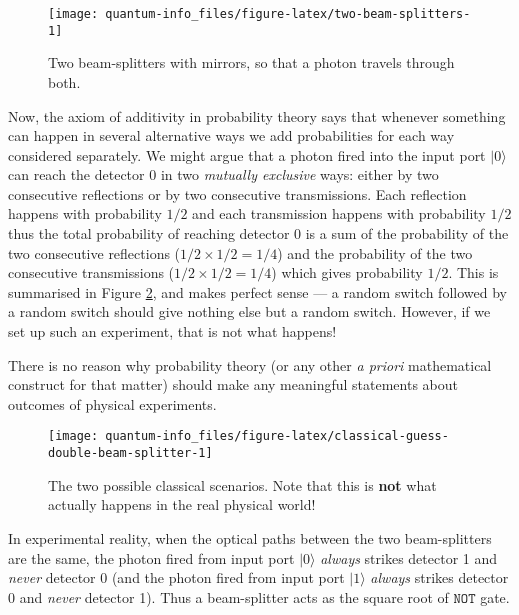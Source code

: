 \documentclass[fleqn]{article}
\newenvironment{idea}{\noindent}{\medskip}
\begin{document}
\begin{figure}[H]

{\centering \texttt{[image: quantum-info\_files/figure-latex/two-beam-splitters-1]} 

}

\caption{Two beam-splitters with mirrors, so that a photon travels through both.}\label{fig:two-beam-splitters}
\end{figure}

Now, the axiom of additivity in probability theory says that whenever something can happen in several alternative ways we add probabilities for each way considered separately.
We might argue that a photon fired into the input port \(|0\rangle\) can reach the detector \(0\) in two \emph{mutually exclusive} ways: either by two consecutive reflections or by two consecutive transmissions.
Each reflection happens with probability \(1/2\) and each transmission happens with probability \(1/2\) thus the total probability of reaching detector 0 is a sum of the probability of the two consecutive reflections (\(1/2\times 1/2 = 1/4\)) and the probability of the two consecutive transmissions (\(1/2\times 1/2 = 1/4\)) which gives probability \(1/2\).
This is summarised in Figure \ref{fig:classical-guess-double-beam-splitter}, and makes perfect sense --- a random switch followed by a random switch should give nothing else but a random switch.
However, if we set up such an experiment, that is not what happens!

\begin{idea}

There is no reason why probability theory (or any other \emph{a priori} mathematical construct for that matter) should make any meaningful statements about outcomes of physical experiments.

\end{idea}



\begin{figure}[H]

{\centering \texttt{[image: quantum-info\_files/figure-latex/classical-guess-double-beam-splitter-1]} 

}

\caption{The two possible classical scenarios. Note that this is \textbf{not} what actually happens in the real physical world!}\label{fig:classical-guess-double-beam-splitter}
\end{figure}

In experimental reality, when the optical paths between the two beam-splitters are the same, the photon fired from input port \(|0\rangle\) \emph{always} strikes detector 1 and \emph{never} detector 0 (and the photon fired from input port \(|1\rangle\) \emph{always} strikes detector 0 and \emph{never} detector 1).
Thus a beam-splitter acts as the square root of \(\texttt{NOT}\) gate.
\end{document}
